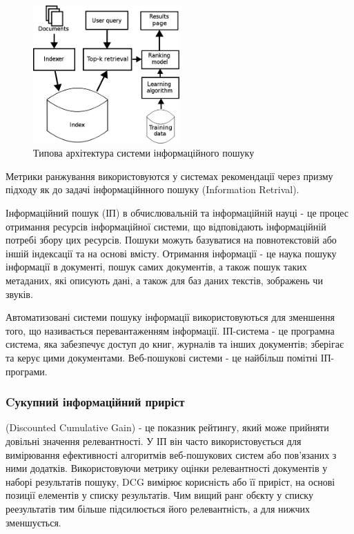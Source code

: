 \begin{figure}[h]
    \centering
    \includegraphics[width=0.5\textwidth]{images/MLR-search-engine-example.png}
    \caption{Типова архітектура системи інформаційного пошуку}
\end{figure}

Метрики ранжування використовуются у системах рекомендації через
призму підходу як до задачі інформаційнного пошуку (Information
Retrival).

Інформаційний пошук (ІП) в обчислювальній та інформаційній науці -
це процес отримання ресурсів інформаційної системи, що
відповідають інформаційній потребі збору цих ресурсів. Пошуки
можуть базуватися на повнотекстовій або іншій індексації та на основі
вмісту. Отримання інформації - це наука пошуку інформації в
документі, пошук самих документів, а також пошук таких метаданих,
які описують дані, а також для баз даних текстів, зображень чи
звуків.

Автоматизовані системи пошуку інформації використовуються для
зменшення того, що називається перевантаженням
інформації. ІП-система - це програмна система, яка забезпечує
доступ до книг, журналів та інших документів; зберігає та керує
цими документами. Веб-пошукові системи - це найбільш помітні
ІП-програми.

\subsubsection{Cукупний інформаційний приріст}
 (Discounted Cumulative
Gain) - це показник рейтингу, який може прийняти довільні значення
релевантності.
У ІП він часто використовується для вимірювання
ефективності алгоритмів веб-пошукових систем або пов'язаних з ними
додатків. Використовуючи метрику оцінки релевантності
документів у наборі результатів пошуку, DCG вимірює корисність або
її приріст, на основі позиції елементів у списку
результатів. Чим вищий ранг обєкту у списку реезультатів тим
більше підсилюється його релевантність, а для нижчих зменшується.

